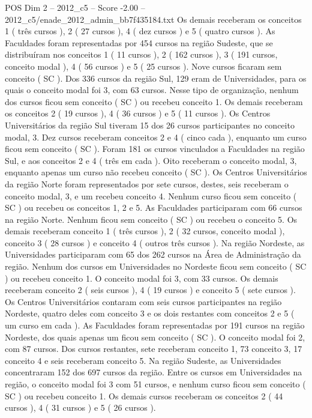 \begin{textsample}{POS Dim 2 – 2012\_c5 – Score -2.00 – 2012\_c5/enade\_2012\_admin\_bb7f435184.txt}
Os demais receberam os conceitos 1 ( três cursos ), 2 ( 27 cursos ), 4 ( dez cursos ) e 5 ( quatro cursos ).
As Faculdades foram representadas por 454 cursos na região Sudeste, que se distribuíram nos conceitos 1 ( 11 cursos ), 2 ( 162 cursos ), 3 ( 191 cursos, conceito modal ), 4 ( 56 cursos ) e 5 ( 25 cursos ).
Nove cursos ficaram sem conceito ( SC ).
Dos 336 cursos da região Sul, 129 eram de Universidades, para os quais o conceito modal foi 3, com 63 cursos.
Nesse tipo de organização, nenhum dos cursos ficou sem conceito ( SC ) ou recebeu conceito 1.
Os demais receberam os conceitos 2 ( 19 cursos ), 4 ( 36 cursos ) e 5 ( 11 cursos ).
Os Centros Universitários da região Sul tiveram 15 dos 26 cursos participantes no conceito modal, 3.
Dez cursos receberam conceitos 2 e 4 ( cinco cada ), enquanto um curso ficou sem conceito ( SC ).
Foram 181 os cursos vinculados a Faculdades na região Sul, e aos conceitos 2 e 4 ( três em cada ).
Oito receberam o conceito modal, 3, enquanto apenas um curso não recebeu conceito ( SC ).
Os Centros Universitários da região Norte foram representados por sete cursos, destes, seis receberam o conceito modal, 3, e um recebeu conceito 4.
Nenhum curso ficou sem conceito ( SC ) ou recebeu os conceitos 1, 2 e 5.
As Faculdades participaram com 66 cursos na região Norte.
Nenhum ficou sem conceito ( SC ) ou recebeu o conceito 5.
Os demais receberam conceito 1 ( três cursos ), 2 ( 32 cursos, conceito modal ), conceito 3 ( 28 cursos ) e conceito 4 ( outros três cursos ).
Na região Nordeste, as Universidades participaram com 65 dos 262 cursos na Área de Administração da região.
Nenhum dos cursos em Universidades no Nordeste ficou sem conceito ( SC ) ou recebeu conceito 1.
O conceito modal foi 3, com 33 cursos.
Os demais receberam conceito 2 ( seis cursos ), 4 ( 19 cursos ) e conceito 5 ( sete cursos ).
Os Centros Universitários contaram com seis cursos participantes na região Nordeste, quatro deles com conceito 3 e os dois restantes com conceitos 2 e 5 ( um curso em cada ).
As Faculdades foram representadas por 191 cursos na região Nordeste, dos quais apenas um ficou sem conceito ( SC ).
O conceito modal foi 2, com 87 cursos.
Dos cursos restantes, sete receberam conceito 1, 73 conceito 3, 17 conceito 4 e seis receberam conceito 5.
Na região Sudeste, as Universidades concentraram 152 dos 697 cursos da região.
Entre os cursos em Universidades na região, o conceito modal foi 3 com 51 cursos, e nenhum curso ficou sem conceito ( SC ) ou recebeu conceito 1.
Os demais cursos receberam os conceitos 2 ( 44 cursos ), 4 ( 31 cursos ) e 5 ( 26 cursos ).

\end{textsample}
